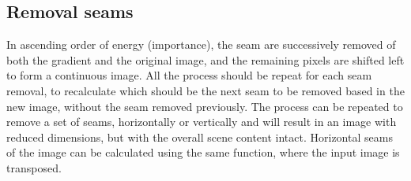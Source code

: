 \documentclass{article}
\begin{document}
	\subsection{Removal seams}
	In ascending order of energy (importance), the seam are successively removed of both the gradient and the original image, and the remaining pixels are shifted left to form a continuous image. All the process should be repeat for each seam removal, to recalculate which should be the next seam to be removed based in the new image, without the seam removed previously. The process can be repeated to remove a set of seams, horizontally or vertically and will result in an image with reduced dimensions, but with the overall scene content intact. Horizontal seams of the image can be calculated using the same function, where the input image is transposed.

{}

\end{document}
